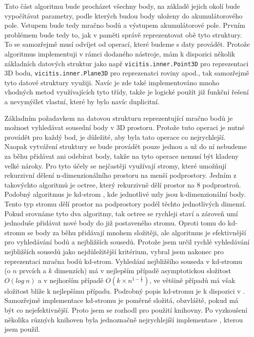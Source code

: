 \documentclass[11pt,twoside,a4paper]{book}
\begin{document}
Tato část algoritmu bude procházet všechny body, na základě jejich okolí bude vypočítávat parametry, podle kterých budou body uloženy do akumulátorového pole. Vstupem bude tedy mračno bodů a výstupem akumulátorové pole. Prvním problémem bude tedy to, jak v paměti správě reprezentovat obě tyto struktury. To se samozřejmě musí odvíjet od operací, které budeme s daty provádět. Protože algoritmus implementuji v rámci dodaného nástroje, mám k dispozici několik základních datových struktur jako např \verb|vicitis.inner.Point3D| pro reprezentaci 3D bodu, \verb|vicitis.inner.Plane3D| pro reprezenatci roviny apod., tak samozřejmě tyto datové struktury využiji. Navíc je zde také implementováno mnoho vhodných metod využívajících tyto třídy, takže je logické použít již funkční řešení a nevymýšlet vlastní, které by bylo navíc duplicitní.

Základním požadavkem na datovou strukturu reprezentující mračno bodů je možnost vyhledávat sousední body v 3D prostoru. Protože tuto operaci je nutné provádět pro každý bod, je důležité, aby byla tato operace co nejrychlejší. Naopak vytváření struktury se bude provádět pouze jednou a už do ní nebudeme za běhu přidávat ani odebírat body, takže na tyto operace nemusí být kladeny velké nároky. Pro tyto účely se nejčastěji využívají stromy, které umožňují rekurzivní dělení n-dimenzionálního prostoru na menší podprostory. Jedním z takovýchto algoritmů je octree, který rekurzivně dělí prostor na 8 podprostroů. Podobný algoritmus je kd-strom \cite{wiki:kdtree}, kde jednotlivé uzly jsou k-dimenzionální body. Tento typ stromu dělí prostor na podprostory podél těchto jednotlivých dimenzí. Pokud srovnáme tyto dva algoritmy, tak octree se rychleji staví a zároveň umí jednoduše přidávat nové body do již postaveného stromu. Oproti tomu do kd-stromu se body za běhu přidávají mnohem složitěji, ale algoritmus je efektivnější pro vyhledávání bodů a nejbližších sousedů. Protože jsem určil rychlé vyhledávání nejbližších sousedů jako nejdůležitější kritérium, vybral jsem nakonec pro reprezentaci mračna bodů kd-strom. Vyhledání nejbližšího souseda v kd-stromu (o $n$ prvcích a $k$ dimenzích) má v nejlepším případě asymptotickou složitost $O(log~n)$ a v nejhorším případě $O(k \times n^{1-\frac{1}{k}})$, ve většině případů má však složitost blíže k nejlepšímu případu. Podrobný popis kd-stromu je k dispozici v \cite{wiki:kdtree}. Samozřejmě implementace kd-stromu je poměrně složitá, obzvláště, pokud má být co nejefektivnější. Proto jsem se rozhodl pro použití knihovny. Po vyzkoušení několika různých knihoven byla jednoznačně nejrychlejíší implementace \cite{kdtree}, kterou jsem použil.
\end{document}
